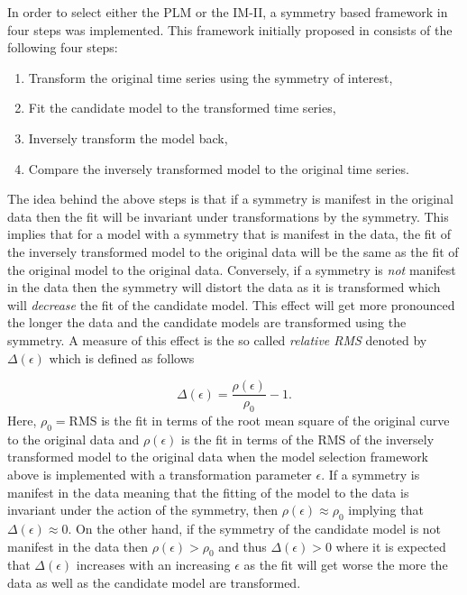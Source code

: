 In order to select either the PLM or the IM-II, a symmetry based framework in four steps was implemented. This framework initially proposed in \cite{ohlsson2020symmetry} consists of the following four steps:

\begin{enumerate}
\item Transform the original time series using the symmetry of interest,
\item Fit the candidate model to the transformed time series,
\item Inversely transform the model back,
\item Compare the inversely transformed model to the original time series.
\end{enumerate}

The idea behind the above steps is that if a symmetry is manifest in the original data then the fit will be invariant under transformations by the symmetry. This implies that for a model with a symmetry that is manifest in the data, the fit of the inversely transformed model to the original data will be the same as the fit of the original model to the original data. Conversely, if a symmetry is \textit{not} manifest in the data then the symmetry will distort the data as it is transformed which will \textit{decrease} the fit of the candidate model. This effect will get more pronounced the longer the data and the candidate models are transformed using the symmetry. A measure of this effect is the so called \textit{relative RMS} denoted by $\Delta(\epsilon)$ \cite{ohlsson2020symmetry} which is defined as follows

\begin{equation}
\Delta(\epsilon)=\dfrac{\rho(\epsilon)}{\rho_{0}}-1.
  \label{eq:model_selection}
\end{equation}
Here, $\rho_{0}=\mathrm{RMS}$ is the fit in terms of the root mean square of the original curve to the original data and $\rho(\epsilon)$ is the fit in terms of the RMS of the inversely transformed model to the original data when the model selection framework above is implemented with a transformation parameter $\epsilon$. If a symmetry is manifest in the data meaning that the fitting of the model to the data is invariant under the action of the symmetry, then $\rho(\epsilon)\approx \rho_{0}$ implying that $\Delta(\epsilon)\approx 0$. On the other hand, if the symmetry of the candidate model is not manifest in the data then $\rho(\epsilon)> \rho_{0}$ and thus $\Delta(\epsilon)>0$ where it is expected that $\Delta(\epsilon)$ increases with an increasing $\epsilon$ as the fit will get worse the more the data as well as the candidate model are transformed.

